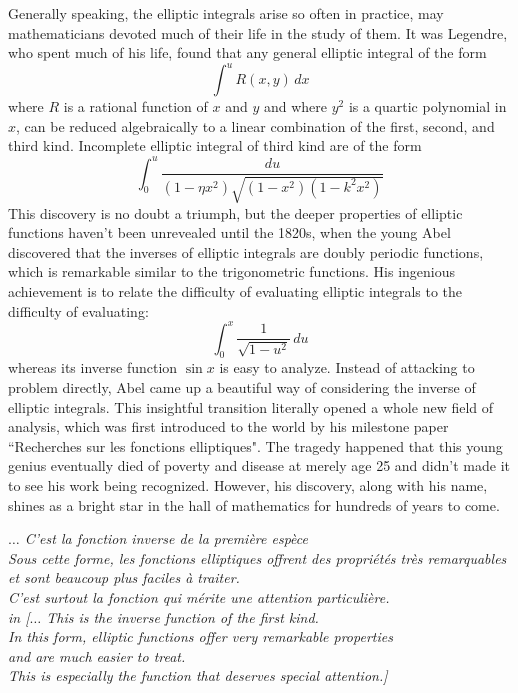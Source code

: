 \documentclass{report}
\begin{document}
\begin{titlepage}
Generally speaking, the elliptic integrals arise so often in practice, may mathematicians devoted much of their life in the study of them. It was Legendre, who spent much of his life, found that any general elliptic integral of the form 
\[
\int^uR(x,y)\,dx
\]
where $R$ is a rational function of $x$ and $y$ and where $y^2$ is a quartic polynomial in $x$,  
can be reduced algebraically to a linear combination of the first, second, and third kind\cite{Abel:1992aa}\cite{Borwein:1987aa}. Incomplete elliptic integral of third kind are of the form\cite{Borwein:1987aa}
\[
\int_0^u\frac{du}{(1-\eta x^2)\sqrt{(1-x^2)(1-k^2x^2)}}
\]
This discovery is no doubt a triumph, but the deeper properties of elliptic functions haven't been unrevealed until the 1820s, when the young Abel discovered that the inverses of elliptic integrals are doubly periodic functions, which is remarkable similar to the trigonometric functions.  His ingenious achievement is to relate the difficulty of evaluating elliptic integrals to the difficulty of evaluating:
\[
\int_0^x\frac{1}{\sqrt{1-u^2}}\,du
\]
whereas its inverse function $\sin x$ is easy to analyze\cite{Abel:1992aa}. Instead of attacking to problem directly, Abel came up a beautiful way of considering the inverse of elliptic integrals. This insightful transition literally opened a whole new field of analysis, which was first introduced to the world by his milestone paper ``Recherches sur les fonctions elliptiques". The tragedy happened that this young genius eventually died of poverty and disease at merely age 25 and didn't made it to see his work being recognized. However, his discovery, along with his name, shines as a bright star in the hall of mathematics for hundreds of years to come.\bigskip

\vfill
{\flushright
	{\sffamily\slshape
		$\ldots$ C'est la fonction inverse de la premi\`ere esp\`ece\\
		 Sous cette forme, les fonctions elliptiques offrent des propri\'et\'es tr\`es
		 remarquables\\
		 et sont beaucoup plus faciles \`a traiter.\\
		  C'est surtout la fonction qui m\'erite une attention particuli\`ere. \\
		   in
		  [$\ldots$ This is the inverse function of the first kind. \\
		  In this form, elliptic functions offer very remarkable properties\\
		   and are much easier to treat.\\
		    This is especially the function that deserves special attention.]
		  
}}
\end{titlepage}
\end{document}
